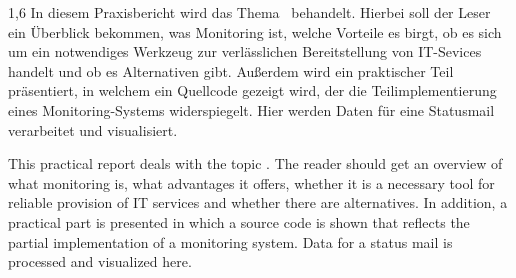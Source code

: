 \begin{spacing}{1,6}
	In diesem Praxisbericht wird das Thema \glqq\Titel\grqq\ behandelt. Hierbei soll der Leser ein Überblick bekommen, was Monitoring ist, welche Vorteile es birgt, ob es sich um ein notwendiges Werkzeug zur verlässlichen Bereitstellung von IT-Sevices handelt und ob es Alternativen gibt. Außerdem wird ein praktischer Teil präsentiert, in welchem ein Quellcode gezeigt wird, der die Teilimplementierung eines Monitoring-Systems widerspiegelt. Hier werden Daten für eine Statusmail verarbeitet und visualisiert.
	
	This practical report deals with the topic \glqq\Titel\grqq . The reader should get an overview of what monitoring is, what advantages it offers, whether it is a necessary tool for reliable provision of IT services and whether there are alternatives. In addition, a practical part is presented in which a source code is shown that reflects the partial implementation of a monitoring system. Data for a status mail is processed and visualized here.
\end{spacing}

